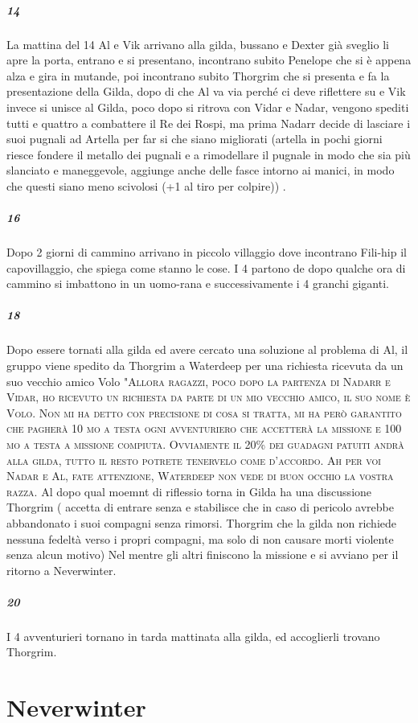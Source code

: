 \documentclass{article}
\begin{document}
\subparagraph{14}
La mattina del 14 Al e Vik arrivano alla gilda,  bussano e Dexter già sveglio li apre la porta, entrano e si presentano, incontrano subito Penelope che si è appena alza e gira in mutande, poi incontrano subito Thorgrim che si presenta e fa la presentazione della Gilda, dopo di che Al va via perché ci deve riflettere su e Vik invece si unisce al Gilda, poco dopo si ritrova con Vidar e Nadar, vengono spediti tutti e quattro a combattere il Re dei Rospi, ma prima Nadarr decide di lasciare i suoi pugnali ad Artella per far si che siano migliorati (artella in pochi giorni riesce fondere il metallo dei pugnali e a rimodellare il pugnale in modo che sia più slanciato e maneggevole, aggiunge anche delle fasce intorno ai manici, in modo che questi siano meno scivolosi (+1 al tiro per colpire)) . 


\subparagraph{16}
Dopo 2 giorni di cammino arrivano in piccolo villaggio dove incontrano Fili-hip il capovillaggio, che spiega come stanno le cose. I 4 partono de dopo qualche ora di cammino si imbattono in un uomo-rana e successivamente i 4 granchi giganti.

\subparagraph{18}

 Dopo essere tornati alla gilda ed avere cercato una soluzione al problema di Al, il gruppo viene spedito da Thorgrim a Waterdeep per una richiesta ricevuta da un suo vecchio amico Volo "\textsc{Allora ragazzi, poco dopo la partenza di Nadarr e Vidar, ho ricevuto un richiesta da parte di un mio vecchio amico, il suo nome è Volo. Non mi ha detto con precisione di cosa si tratta, mi ha però garantito che pagherà 10 mo a testa ogni avventuriero che accetterà la missione e 100 mo a testa a missione compiuta. Ovviamente il 20\% dei guadagni patuiti andrà alla gilda, tutto il resto potrete tenervelo come d'accordo. Ah per voi Nadar e Al, fate attenzione,  Waterdeep non vede di buon occhio la vostra razza}.  Al dopo qual moemnt di riflessio torna in Gilda ha una discussione Thorgrim ( accetta di entrare senza e stabilisce che in caso di pericolo avrebbe abbandonato i suoi compagni senza rimorsi. Thorgrim che la gilda non richiede nessuna fedeltà verso i propri compagni, ma solo di non causare morti violente senza alcun motivo) 
   Nel mentre gli altri finiscono la missione e si avviano per il ritorno a Neverwinter. 
\subparagraph{20}
I 4 avventurieri tornano in tarda mattinata alla gilda, ed accoglierli trovano Thorgrim. 

\section{Neverwinter}
\end{document}
